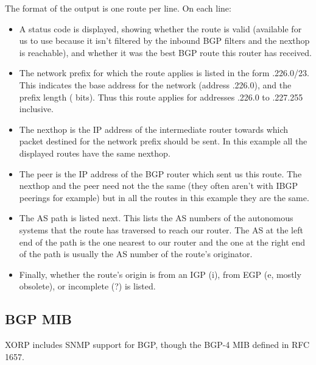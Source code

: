 The format of the output is one route per line.  On each line:
\begin{itemize}
\item A status code is displayed, showing whether the route is valid
(available for us to use because it isn't filtered by the inbound BGP
filters and the nexthop is reachable), and whether it was the best BGP
route this router has received.
\item The network prefix for which the route applies is listed in the
  form {.226.0/23}.  This indicates the base address for the
  network (address {.226.0}), and the prefix length ({} bits).
  Thus this route applies for addresses {.226.0} to {.227.255} inclusive.
\item The nexthop is the IP address of the intermediate router towards
  which packet destined for the network prefix should be sent.  In
  this example all the displayed routes have the same nexthop.
\item The peer is the IP address of the BGP router which sent us this
  route.  The nexthop and the peer need not the the same (they often
  aren't with IBGP peerings for example) but in all the routes in this
  example they are the same.
\item The AS path is listed next.  This lists the AS numbers of the
  autonomous systems that the route has traversed to reach our
  router.  The AS at the left end of the path is the one nearest to
  our router and the one at the right end of the path is usually the
  AS number of the route's originator.  
\item Finally, whether the route's origin is from an IGP ({\stt i}),
  from EGP ({\stt e}, mostly obsolete), or incomplete ({\stt ?}) is
  listed.
\end{itemize}

\subsection{BGP MIB}

XORP includes SNMP support for BGP, though the BGP-4 MIB defined in
RFC 1657.

